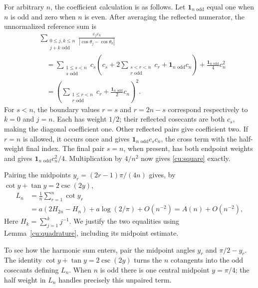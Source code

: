 For arbitrary $n$, the coefficient calculation is as follows.
Let $\boldsymbol1_{n\text{ odd}}$ equal one when $n$ is odd and zero when $n$ is even.
After averaging the reflected numerator, the unnormalized reference
sum is
\[
 \begin{aligned}
 &\sum_{\substack{0\leq j,k\leq n\\j+k\text{ odd}}}
       \frac{\varepsilon_j\varepsilon_k}
            {|\cos\theta_j-\cos\theta_k|}\\
 &\quad=\sum_{\substack{1\leq s<n\\s\text{ odd}}}
    c_s\left(c_s+2\sum_{\substack{s<r<n\\r\text{ odd}}}c_r+\boldsymbol1_{n\text{ odd}}c_n\right)
       +\frac{\boldsymbol1_{n\text{ odd}}}{4}c_n^2\\
 &\quad=\left(\sum_{\substack{1\leq r<n\\r\text{ odd}}}c_r
                                      +\frac{\boldsymbol1_{n\text{ odd}}}{2}c_n\right)^2.
 \end{aligned}
\]
For $s<n$, the boundary values $r=s$ and $r=2n-s$ correspond
respectively to $k=0$ and $j=n$. Each has weight $1/2$; their
reflected cosecants are both $c_s$, making the diagonal coefficient
one. Other reflected pairs give coefficient two. If $r=n$ is
allowed, it occurs once and gives $\boldsymbol1_{n\text{ odd}}c_sc_n$, the cross term with
the half-weight final index. The final pair $s=n$, when present,
has both endpoint weights and gives $\boldsymbol1_{n\text{ odd}}c_n^2/4$. Multiplication
by $4/n^2$ now gives \eqref{cu:square} exactly.

Pairing the midpoints $y_r=(2r-1)\pi/(4n)$ gives, by
$\cot y+\tan y=2\csc(2y)$,
\[
 \begin{aligned}
 L_n&=\frac1n\sum_{r=1}^n\cot y_r\\
    &=a(2H_{2n}-H_n)+a\log(2/\pi)+O(n^{-2})=A(n)+O(n^{-2}),
 \end{aligned}
\]
Here $H_k=\sum_{j=1}^k j^{-1}$. We justify the two equalities
using Lemma~\ref{cu:quadrature}, including its midpoint estimate.

To see how the harmonic sum enters, pair the midpoint angles
$y_r$ and $\pi/2-y_r$. The identity
$\cot y+\tan y=2\csc(2y)$ turns the $n$ cotangents into the
odd cosecants defining $L_n$. When $n$ is odd there is one central
midpoint $y=\pi/4$; the half weight in $L_n$ handles precisely this
unpaired term.


